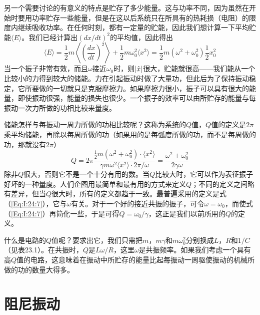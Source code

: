 另一个需要讨论的有意义的特点是贮存了多少能量。这与功率不同，因为虽然在开始时要用功率贮存一些能量，但是在这以后系统只在所具有的热耗损（电阻）的限度内继续吸收功率。在任何时刻，都有一定量的贮能，因此我们想计算一下平均贮能$\langle E \rangle$。我们已经计算出$(dx/dt)^2$的平均值，因此得出
\begin{equation}
    \label{Eq:I:24:6}
    \langle E \rangle = \frac{1}{2}m \left \langle \left ( \frac{dx}{dt} \right )^2 \right \rangle + \frac{1}{2}m\omega_0^2 \langle x^2 \rangle = \frac{1}{2}m(\omega^2 + \omega_0^2)\frac{1}{2}x_0^2
\end{equation}
当一个振子非常有效，而且$\omega$接近$\omega_0$时，则$\lvert\hat{x}\rvert$很大，贮能就很高——我们能从一个比较小的力得到较大的储能。力在引起振动时做了大量功，但此后为了保持振动稳定，它所要做的一切就只是克服摩擦力。如果摩擦力很小，振子可以具有很大的能量，即使振动很强，能量的损失也很少。一个振子的效率可以由所贮存的能量与每振动一次力所做的功相比较来量度。

储能怎样与每振动一周力所做的功相比较呢？这称为系统的$Q$值，$Q$值的定义是$2\pi$乘平均储能，再除以每周所做的功（如果用的是每弧度所做的功，而不是每周做的功，那就没有$2\pi$）
\begin{equation}
    \label{Eq:I:24:7}
    Q=2\pi \frac{\frac{1}{2}m(\omega^2 + \omega_0^2) \cdot \langle x^2 \rangle}{\gamma m \omega^2 \langle x^2 \rangle \cdot 2\pi / \omega} = \frac{\omega^2 + \omega_0^2}{2\gamma\omega}
\end{equation}
除非$Q$很大，否则它不是一个十分有用的数。当$Q$比较大时，它可以作为表征振子好坏的一种量度。人们企图用最简单和最有用的方式来定义$Q$；不同的定义之间略有差异，但当$Q$很大时，所有的定义都趋于一致。最普遍采用的定义是式（\ref{Eq:I:24:7}），它与$\omega$有关。对于一个好的接近共振的振子，可令$\omega=\omega_0$，而使式（\ref{Eq:I:24:7}）再简化一些，于是可得$Q=\omega_0/\gamma$，这正是我们以前所用的$Q$的定义。

什么是电路的$Q$值呢？要求出它，我们只需把$m$，$m\gamma$和$m\omega^2_0$分别换成$L$，$R$和$1/C$（见表23.1）。在共振时，$Q$是$L\omega/R$，这里$\omega$是共振频率。如果我们考虑一个具有高$Q$值的电路，这意味着在振动中所贮存的能量比起每振动一周驱使振动的机械所做的功的数量大得多。

\section{阻尼振动}

